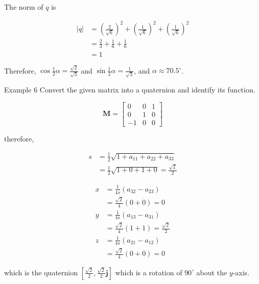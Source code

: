 The norm of $q$ is

$$
\begin{aligned}
|q| & =\left(\frac{2}{\sqrt{6}}\right)^{2}+\left(\frac{1}{\sqrt{6}}\right)^{2}+\left(\frac{1}{\sqrt{6}}\right)^{2} \\
& =\frac{2}{3}+\frac{1}{6}+\frac{1}{6} \\
& =1
\end{aligned}
$$

Therefore, $\cos \frac{1}{2} \alpha=\frac{\sqrt{2}}{\sqrt{3}}$ and $\sin \frac{1}{2} \alpha=\frac{1}{\sqrt{3}}$, and $\alpha \approx 70.5^{\circ}$.

Example 6 Convert the given matrix into a quaternion and identify its function.

$$
\mathbf{M}=\left[\begin{array}{ccc}
0 & 0 & 1 \\
0 & 1 & 0 \\
-1 & 0 & 0
\end{array}\right]
$$

therefore,

$$
\begin{aligned}
s & =\frac{1}{2} \sqrt{1+a_{11}+a_{22}+a_{33}} \\
& =\frac{1}{2} \sqrt{1+0+1+0}=\frac{\sqrt{2}}{2}
\end{aligned}
$$

$$
\begin{aligned}
x & =\frac{1}{4 s}\left(a_{32}-a_{23}\right) \\
& =\frac{\sqrt{2}}{4}(0+0)=0 \\
y & =\frac{1}{4 s}\left(a_{13}-a_{31}\right) \\
& =\frac{\sqrt{2}}{4}(1+1)=\frac{\sqrt{2}}{2} \\
z & =\frac{1}{4 s}\left(a_{21}-a_{12}\right) \\
& =\frac{\sqrt{2}}{4}(0+0)=0
\end{aligned}
$$

which is the quaternion $\left[\frac{\sqrt{2}}{2}, \frac{\sqrt{2}}{2} \mathbf{j}\right]$ which is a rotation of $90^{\circ}$ about the $y$-axis.

